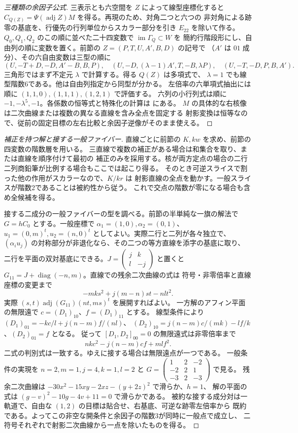 \begin{proof}[三種類の余因子公式]
三表示とも六空間を $Z$ によって線型座標化すると
$C_{Q(Z)}=\Psi(\operatorname{adj}Z)M$ を得る。再現のため、対角二つと六つの
非対角による跡零の基底を、行優先の行列単位からスカラー部分を引き $E_{22}$ を除いて作る。
$Q_0,Q_1,Q_2$ のこの順に並べた二十四変数で $\operatorname{im}\Gamma_Q\subset W$ を
簡約行階段形にし、自由列の順に変数を置く。前節の $Z=(P,T,U,A',B,D)$ の記号で
（$A'$ は $01$ 成分）、その六自由変数は三型の順に
\[
 (U,-T+D,-D,A'-B,B,P),\quad
 (U,-D,(\lambda-1)A',T,-B,\lambda P),\quad
 (U,-T,-D,P,B,A').
\]
三角形ではまず不定元 $\lambda$ で計算する。得る $Q(Z)$ は多項式で、
$\lambda=1$ でも線型階数6である。他は自由列指定から同型が分かる。
左倍率の六単項式抽出には順に $(1,1,0),(1,1,1),(1,2,1)$ で評価する。
六列の小行列式は順に $-1,-\lambda^5,-1$。各係数の恒等式と特殊化の計算は
 にある。
$M$ の具体的な右核像は二次曲線または複数の異なる直線を含み全点を固定する
射影変換は恒等なので、従前の固定目標の左右比較と余因子逆像がそのまま使える。
\end{proof}

\begin{proof}[補正を持つ解と接する一般ファイバー]
直線ごとに前節の $K,kw$ を求め、前節の四変数の階数層を用いる。
三直線で複数の補正がある場合は和集合を取り、または直線を順序付けて最初の
補正のみを採用する。核が両方定点の場合の二行二列商鉛筆が比例する場合もここでは起こり得る。
そのとき可逆スライスで割った他の作用がスカラーなので、$K/kr$ は
射影直線の全点を動かす。一般スライスが階数2であることは被約性から従う。
これで交点の階数が零になる場合も含め全候補を得る。

接する二成分の一般ファイバーの型を調べる。前節の半単純な一旗の解法で
$G=hC_0$ とする。一般座標で $\alpha_1=(1,0),\alpha_2=(0,1)$、
$u_1=(0,m)^t,u_2=(n,0)^t$ としてよい。実際二行と二列が各々独立で、
$(\alpha_i u_j)$ の対称部分が非退化なら、その二つの等方直線を添字の基底に取り、
二行を平面の双対基底にできる。$J=\left(\begin{smallmatrix}j&k\\l&-j\end{smallmatrix}\right)$
と置くと $G_{11}=J+\operatorname{diag}(-n,m)$。直線での残余二次曲線の式は
符号・非零倍率と直線座標の変更まで
\[
              -mk s^2+j(m-n)st-nl t^2 .
\]
実際 $(s,t)\operatorname{adj}(G_{11})(nt,ms)^t$ を展開すればよい。
一方解のアフィン平面の無限遠で $c=(D_1)_{10}$、$f=(D_1)_{11}$ とする。
線型条件により $(D_1)_{01}=-kc/l+j(n-m)f/(nl)$、
$(D_2)_{10}=j(n-m)c/(mk)-lf/k$、$(D_2)_{01}=f$ となる。
従って $[D_1,D_2]_{00}=0$ の無限遠式は非零倍率まで
\[
                   nk c^2-j(n-m)cf+ml f^2 .
\]
二式の判別式は一致する。ゆえに接する場合は無限遠点が一つである。
一般条件の実現を $n=2,m=1,j=4,k=1,l=2$ と
$G=\left(\begin{smallmatrix}1&2&-2\\-2&2&1\\-3&2&-3\end{smallmatrix}\right)$ で見る。
残余二次曲線は $-30x^2-15xy-2xz-(y+2z)^2$ で滑らか、$h=1$、
解の平面の式は $(g-v)^2-10g-4v+11=0$ で滑らかである。
被約な接する成分対は一軌道で、自由な $(1,2)$ の目標は貼合せ、右基底、可逆な跡零左倍率から
既約である。よってこの非空な開条件と余因子の階数3が同時に一般点で成立し、
二符号それぞれで射影二次曲線から一点を除いたものを得る。
\end{proof}
